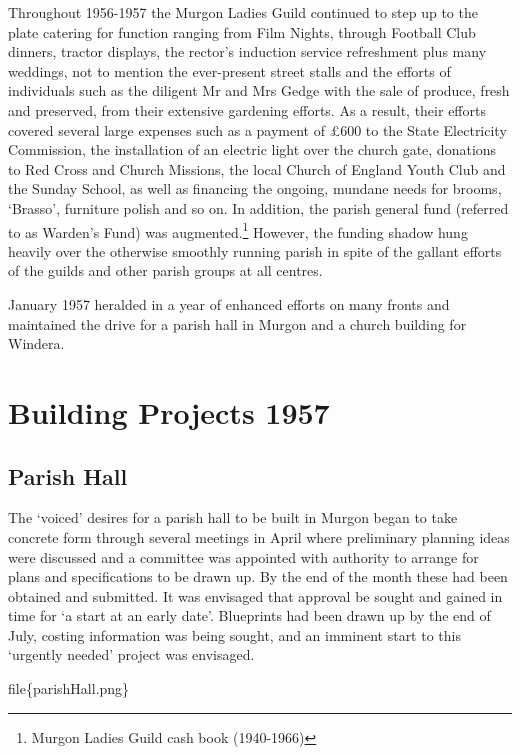 Throughout 1956-1957 the Murgon Ladies Guild continued to step up to the plate catering for function ranging from Film Nights, through Football Club dinners, tractor displays, the rector's induction service refreshment plus many weddings, not to mention the ever-present street stalls and the efforts of individuals such as the diligent Mr and Mrs Gedge with the sale of produce, fresh and preserved, from their extensive gardening efforts. As a result, their efforts covered several large expenses such as a payment of £600 to the State Electricity Commission, the installation of an electric light over the church gate, donations to Red Cross and Church Missions, the local Church of England Youth Club and the Sunday School, as well as financing the ongoing, mundane needs for brooms, `Brasso', furniture polish and so on. In addition, the parish general fund (referred to as Warden's Fund) was augmented.\footnote{Murgon Ladies Guild cash book (1940-1966)} However, the funding shadow hung heavily over the otherwise smoothly running parish in spite of the gallant efforts of the guilds and other parish groups at all centres.

January 1957 heralded in a year of enhanced efforts on many fronts and maintained the drive for a parish hall in Murgon and a church building for Windera.

\hypertarget{building-projects-1957}{%
\section{Building Projects 1957}\label{building-projects-1957}}

\hypertarget{parish-hall}{%
\subsection{Parish Hall}\label{parish-hall}}

The `voiced' desires for a parish hall to be built in Murgon began to take concrete form through several meetings in April where preliminary planning ideas were discussed and a committee was appointed with authority to arrange for plans and specifications to be drawn up. By the end of the month these had been obtained and submitted. It was envisaged that approval be sought and gained in time for `a start at an early date'. Blueprints had been drawn up by the end of July, costing information was being sought, and an imminent start to this `urgently needed' project was envisaged.

file\{parishHall.png\}

